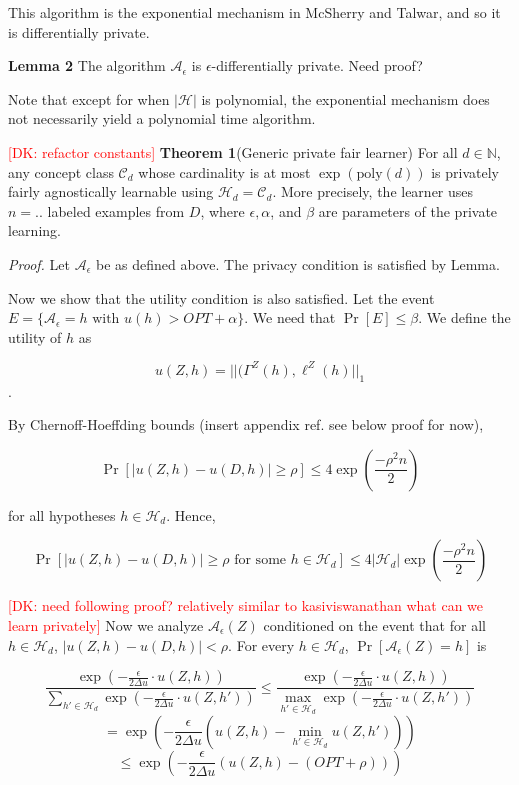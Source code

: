 \documentclass[format = sigconf]{acmart}
\newcommand{\dk}[1]{\textcolor{red}{[DK: #1]}}
\newcommand{\A}{\mathcal{A}}
\renewcommand{\H}{\mathcal{H}}
\renewcommand{\C}{\mathcal{C}}
\newcommand{\1}{\mathbbm{1}}
\theoremstyle{definition}
\begin{document}
This algorithm is the exponential mechanism in McSherry and Talwar, and so it is differentially private.

{\bf Lemma 2} The algorithm $\A_\epsilon$ is $\epsilon$-differentially private.
Need proof?

Note that except for when $|\H|$ is polynomial, the exponential mechanism does not necessarily yield a polynomial time algorithm.

\dk{refactor constants}
{\bf Theorem 1}(Generic private fair learner) For all $d \in \mathbb{N}$, any concept class $\mathcal{C}_d$ whose cardinality is at most $\exp(\text{poly}(d))$ is privately fairly agnostically learnable using $\H_d = \C_d$. More precisely, the learner uses $n = ..$ labeled examples from $D$, where $\epsilon, \alpha$, and $\beta$ are parameters of the private learning.

{\it Proof.} Let $\A_{\epsilon}$ be as defined above. The privacy condition is satisfied by Lemma.

Now we show that the utility condition is also satisfied. Let the event $E = \{\A_{\epsilon} = h \text{ with } u(h) > OPT + \alpha\}$. We need that $\Pr[E] \leq \beta$. We define the utility of $h$ as

$$u(Z,h) = ||(\Gamma^Z(h), \ell^Z(h)||_{1}$$.

By Chernoff-Hoeffding bounds (insert appendix ref. see below proof for now),



$$\Pr[|u(Z,h) - u(D,h)| \geq \rho] \leq 4\exp(\frac{-\rho^2n}{2})$$

for all hypotheses $h \in \H_d$. Hence,

$$\Pr[|u(Z,h) - u(D,h)| \geq \rho \text{ for some } h \in \H_d] \leq 4|\H_d|\exp(\frac{-\rho^2n}{2})$$

\dk{need following proof? relatively similar to kasiviswanathan what can we learn privately}
Now we analyze $\A_\epsilon(Z)$ conditioned on the event that for all $h\in \H_d$, $|u(Z,h) - u(D,h)| < \rho$. For every $h \in \H_d$, $\Pr[\A_\epsilon(Z) = h]$ is

$$\frac{\exp(-\frac{\epsilon}{2\Delta u} \cdot u(Z,h))}{\sum_{h'\in\H_d}\exp(-\frac{\epsilon}{2\Delta u} \cdot u(Z,h'))} \leq \frac{\exp(-\frac{\epsilon}{2\Delta u} \cdot u(Z,h))}{\max_{h'\in\H_d}\exp(-\frac{\epsilon}{2\Delta u} \cdot u(Z,h'))} $$
$$= \exp(-\frac{\epsilon}{2\Delta u}(u(Z,h) - \min_{h'\in\H_d}u(Z,h')))$$
$$\leq \exp(-\frac{\epsilon}{2\Delta u}(u(Z,h) - (OPT + \rho)))$$
\end{document}

